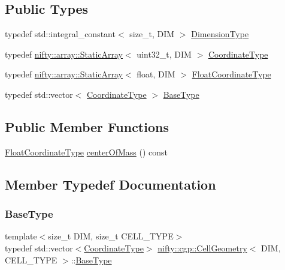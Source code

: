 \subsection*{Public Types}
\begin{DoxyCompactItemize}
\item 
typedef std\+::integral\+\_\+constant$<$ size\+\_\+t, D\+IM $>$ \hyperlink{classnifty_1_1cgp_1_1CellGeometry_a8cc75c7033c03864e099a5d907de88d8}{Dimension\+Type}
\item 
typedef \hyperlink{namespacenifty_1_1array_a683f151f19c851754e0c6d55ed16a0c2}{nifty\+::array\+::\+Static\+Array}$<$ uint32\+\_\+t, D\+IM $>$ \hyperlink{classnifty_1_1cgp_1_1CellGeometry_af8ae7d6b7a8f20afae6ce53e88604acf}{Coordinate\+Type}
\item 
typedef \hyperlink{namespacenifty_1_1array_a683f151f19c851754e0c6d55ed16a0c2}{nifty\+::array\+::\+Static\+Array}$<$ float, D\+IM $>$ \hyperlink{classnifty_1_1cgp_1_1CellGeometry_a07e98f74f6dc5cda1aab1349c7f60d5b}{Float\+Coordinate\+Type}
\item 
typedef std\+::vector$<$ \hyperlink{classnifty_1_1cgp_1_1CellGeometry_af8ae7d6b7a8f20afae6ce53e88604acf}{Coordinate\+Type} $>$ \hyperlink{classnifty_1_1cgp_1_1CellGeometry_ada76b5372b0e456edf3496813b9ed7f0}{Base\+Type}
\end{DoxyCompactItemize}
\subsection*{Public Member Functions}
\begin{DoxyCompactItemize}
\item 
\hyperlink{classnifty_1_1cgp_1_1CellGeometry_a07e98f74f6dc5cda1aab1349c7f60d5b}{Float\+Coordinate\+Type} \hyperlink{classnifty_1_1cgp_1_1CellGeometry_a5372d779eeab46c0480e13c9e4ee8a1f}{center\+Of\+Mass} () const
\end{DoxyCompactItemize}


\subsection{Member Typedef Documentation}
\mbox{\label{classnifty_1_1cgp_1_1CellGeometry_ada76b5372b0e456edf3496813b9ed7f0}} 
\subsubsection{\texorpdfstring{Base\+Type}{BaseType}}
{\footnotesize\ttfamily template$<$size\+\_\+t D\+IM, size\+\_\+t C\+E\+L\+L\+\_\+\+T\+Y\+PE$>$ \\
typedef std\+::vector$<$\hyperlink{classnifty_1_1cgp_1_1CellGeometry_af8ae7d6b7a8f20afae6ce53e88604acf}{Coordinate\+Type}$>$ \hyperlink{classnifty_1_1cgp_1_1CellGeometry}{nifty\+::cgp\+::\+Cell\+Geometry}$<$ D\+IM, C\+E\+L\+L\+\_\+\+T\+Y\+PE $>$\+::\hyperlink{classnifty_1_1cgp_1_1CellGeometry_ada76b5372b0e456edf3496813b9ed7f0}{Base\+Type}}

